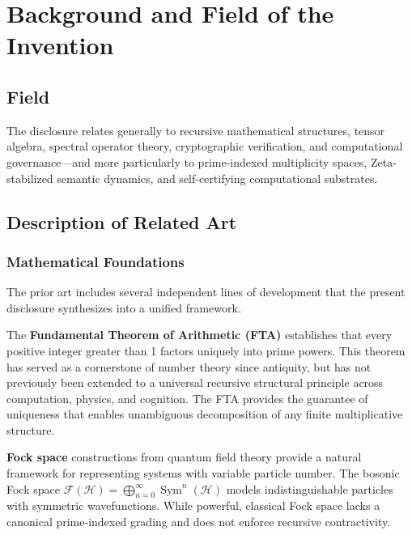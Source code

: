 \documentclass[12pt]{article}
\theoremstyle{plain}
\theoremstyle{definition}
\theoremstyle{remark}
\begin{document}
\section{Background and Field of the Invention}

\subsection{Field}

The disclosure relates generally to recursive mathematical structures, tensor algebra, spectral operator theory, cryptographic verification, and computational governance—and more particularly to prime-indexed multiplicity spaces, Zeta-stabilized semantic dynamics, and self-certifying computational substrates.

\subsection{Description of Related Art}

\subsubsection{Mathematical Foundations}

The prior art includes several independent lines of development that the present disclosure synthesizes into a unified framework.

The \textbf{Fundamental Theorem of Arithmetic (FTA)} establishes that every positive integer greater than 1 factors uniquely into prime powers. This theorem has served as a cornerstone of number theory since antiquity, but has not previously been extended to a universal recursive structural principle across computation, physics, and cognition. The FTA provides the guarantee of uniqueness that enables unambiguous decomposition of any finite multiplicative structure.

\textbf{Fock space} constructions from quantum field theory provide a natural framework for representing systems with variable particle number. The bosonic Fock space $\mathcal{F}(\mathcal{H}) = \bigoplus_{n=0}^\infty \operatorname{Sym}^n(\mathcal{H})$ models indistinguishable particles with symmetric wavefunctions. While powerful, classical Fock space lacks a canonical prime-indexed grading and does not enforce recursive contractivity.
\end{document}
